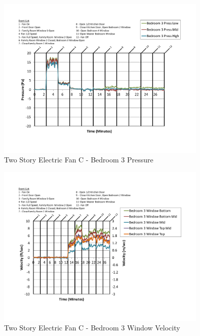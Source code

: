 \documentclass{article}
\begin{document}
\begin{appendices}
	\begin{figure}[H]
		\centering
		\includegraphics[height=3.05in,trim=0.67in 1.1in 0.67in 0.8in,clip=true]{0_Images/Results_Charts/ColdFlow/Two_Story/Electric/C/Bedroom_3_Pressure.pdf}
		\caption{Two Story Electric Fan C - Bedroom 3 Pressure}
	\end{figure}
 

	\begin{figure}[H]
		\centering
		\includegraphics[height=3.05in,trim=0.67in 1.1in 0.67in 0.8in,clip=true]{0_Images/Results_Charts/ColdFlow/Two_Story/Electric/C/Bedroom_3_Window_Velocity.pdf}
		\caption{Two Story Electric Fan C - Bedroom 3 Window Velocity}
	\end{figure}
 
	\clearpage


\end{appendices}
\end{document}
